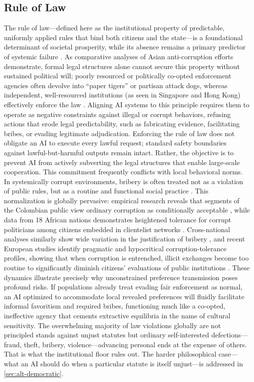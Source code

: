 \documentclass{article}
\theoremstyle{plain}
\theoremstyle{definition}
\theoremstyle{remark}
\begin{document}
\subsection{Rule of Law}
The rule of law---defined here as the institutional property of predictable, uniformly applied rules that bind both citizens and the state---is a foundational determinant of societal prosperity, while its absence remains a primary predictor of systemic failure \citep{north1990institutions, acemoglu2012why}. As comparative analyses of Asian anti-corruption efforts demonstrate, formal legal structures alone cannot secure this property without sustained political will; poorly resourced or politically co-opted enforcement agencies often devolve into ``paper tigers'' or partisan attack dogs, whereas independent, well-resourced institutions (as seen in Singapore and Hong Kong) effectively enforce the law \citep{quah2011curbing}. Aligning AI systems to this principle requires them to operate as negative constraints against illegal or corrupt behaviors, refusing actions that erode legal predictability, such as fabricating evidence, facilitating bribes, or evading legitimate adjudication. Enforcing the rule of law does not obligate an AI to execute every lawful request; standard safety boundaries against lawful-but-harmful outputs remain intact. Rather, the objective is to prevent AI from actively subverting the legal structures that enable large-scale cooperation. This commitment frequently conflicts with local behavioral norms. In systemically corrupt environments, bribery is often treated not as a violation of public rules, but as a routine and functional social practice \citep{quah2011curbing}. This normalization is globally pervasive: empirical research reveals that segments of the Colombian public view ordinary corruption as conditionally acceptable \citep{lopez2017mapping}, while data from 18 African nations demonstrates heightened tolerance for corrupt politicians among citizens embedded in clientelist networks \citep{chang2017insider}. Cross-national analyses similarly show wide variation in the justification of bribery \citep{kravtsova2017values}, and recent European studies identify pragmatic and hypocritical corruption-tolerance profiles, showing that when corruption is entrenched, illicit exchanges become too routine to significantly diminish citizens' evaluations of public institutions \citep{megias2023deontological, letki2023accept}. These dynamics illustrate precisely why unconstrained preference transmission poses profound risks. If populations already treat evading fair enforcement as normal, an AI optimized to accommodate local revealed preferences will fluidly facilitate informal favoritism and required bribes, functioning much like a co-opted, ineffective agency that cements extractive equilibria in the name of cultural sensitivity. The overwhelming majority of law violations globally are not principled stands against unjust statutes but ordinary self-interested defections---fraud, theft, bribery, violence---advancing personal ends at the expense of others. That is what the institutional floor rules out. The harder philosophical case---what an AI should do when a particular statute is itself unjust---is addressed in \cref{sec:alt-democratic}.
\end{document}
